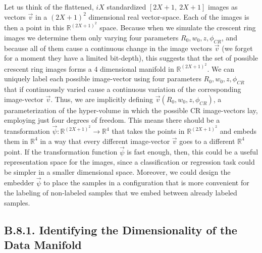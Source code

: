 \documentclass[11pt, a4paper, twoside]{article} %
\newcommand{\R}{\mathbb{R}} %
\begin{document}
Let us think of the flattened, $iX$ standardized $[2X+1,\ 2X+1]$ images as vectors $\vec{v}$ in a $(2X+1)^2$ dimensional real vector-space. Each of the images is then a point in this $\R^{(2X+1)^2}$ space. Because when we simulate the crescent ring images we determine them only varying four parameters $R_0,w_0,z,\phi_{CR}$, and because all of them cause a continuous change in the image vectors $\vec{v}$ (we forget for a moment they have a limited bit-depth), this suggests that the set of possible crescent ring images forms a 4 dimensional manifold in $\R^{(2X+1)^2}$. We can uniquely label each possible image-vector using four parameters $R_0,w_0,z,\phi_{CR}$ that if continuously varied cause a continuous variation of the corresponding image-vector $\vec{v}$. Thus, we are implicitly defining $\vec{v}(R_0,w_0,z,\phi_{CR})$, a parameterization of the hyper-volume in which the possible CR image-vectors lay, employing just four degrees of freedom. This means there should be a transformation $\vec{\psi}:\R^{(2X+1)^2}\rightarrow\R^4$ that takes the points in $\R^{(2X+1)^2}$ and embeds them in $\R^4$ in a way that every different image-vector $\vec{v}$ goes to a different $\R^4$ point. If the transformation function $\vec{\psi}$ is fast enough, then, this could be a useful representation space for the images, since a classification or regression task could be simpler in a smaller dimensional space. Moreover, we could design the embedder $\vec{\psi}$ to place the samples in a configuration that is more convenient for the labeling of non-labeled samples that we embed between already labeled samples.


\subsection*{B.8.1. Identifying the Dimensionality of the Data Manifold}
\end{document}
